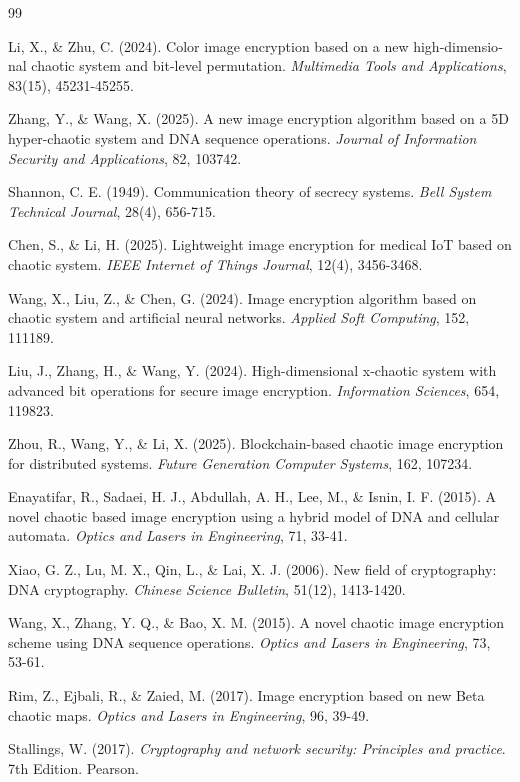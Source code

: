 \begin{thebibliography}{99}
\begin{LTRbibitems}
\begin{latin}
 Li, X., \& Zhu, C. (2024). Color image encryption based on a new high-dimensional chaotic system and bit-level permutation. \textit{Multimedia Tools and Applications}, 83(15), 45231-45255.

 Zhang, Y., \& Wang, X. (2025). A new image encryption algorithm based on a 5D hyper-chaotic system and DNA sequence operations. \textit{Journal of Information Security and Applications}, 82, 103742.

 Shannon, C. E. (1949). Communication theory of secrecy systems. \textit{Bell System Technical Journal}, 28(4), 656-715.

 Chen, S., \& Li, H. (2025). Lightweight image encryption for medical IoT based on chaotic system. \textit{IEEE Internet of Things Journal}, 12(4), 3456-3468.

 Wang, X., Liu, Z., \& Chen, G. (2024). Image encryption algorithm based on chaotic system and artificial neural networks. \textit{Applied Soft Computing}, 152, 111189.

 Liu, J., Zhang, H., \& Wang, Y. (2024). High-dimensional x-chaotic system with advanced bit operations for secure image encryption. \textit{Information Sciences}, 654, 119823.

 Zhou, R., Wang, Y., \& Li, X. (2025). Blockchain-based chaotic image encryption for distributed systems. \textit{Future Generation Computer Systems}, 162, 107234.

 Enayatifar, R., Sadaei, H. J., Abdullah, A. H., Lee, M., \& Isnin, I. F. (2015). A novel chaotic based image encryption using a hybrid model of DNA and cellular automata. \textit{Optics and Lasers in Engineering}, 71, 33-41.

 Xiao, G. Z., Lu, M. X., Qin, L., \& Lai, X. J. (2006). New field of cryptography: DNA cryptography. \textit{Chinese Science Bulletin}, 51(12), 1413-1420.

 Wang, X., Zhang, Y. Q., \& Bao, X. M. (2015). A novel chaotic image encryption scheme using DNA sequence operations. \textit{Optics and Lasers in Engineering}, 73, 53-61.

 Rim, Z., Ejbali, R., \& Zaied, M. (2017). Image encryption based on new Beta chaotic maps. \textit{Optics and Lasers in Engineering}, 96, 39-49.

 Stallings, W. (2017). \textit{Cryptography and network security: Principles and practice}. 7th Edition. Pearson.
\end{latin}
\end{LTRbibitems}

\end{thebibliography}
